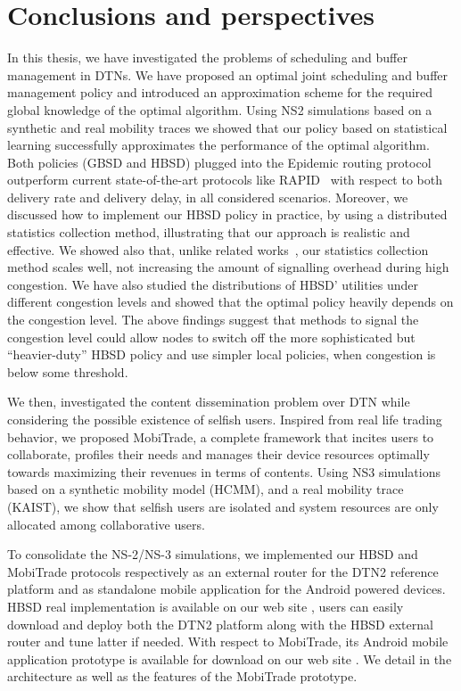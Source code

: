 \chapter{Conclusions and perspectives}
\label{chapter:conclusions}

In this thesis, we have investigated the problems of scheduling and buffer management in DTNs. We have proposed an optimal joint scheduling and buffer management policy and introduced an approximation scheme for the required global knowledge of the optimal algorithm. Using NS2 simulations based on a synthetic and real mobility traces we showed that our policy based on statistical learning successfully approximates the performance of the optimal algorithm. Both
policies (GBSD and HBSD) plugged into the Epidemic routing protocol
outperform current state-of-the-art protocols like RAPID~\cite{Levine:Sigcomm07} with respect to both delivery rate and delivery delay, in all considered scenarios. Moreover, we discussed how to implement our HBSD policy in practice, by using a distributed statistics collection method, illustrating that our approach is realistic and effective. We showed also that, unlike related works~\cite{Levine:Sigcomm07, AOBM}, our statistics collection method scales well, not increasing the amount of signalling overhead during high congestion. We have also studied the distributions of HBSD' utilities under different congestion levels and showed that the optimal policy heavily depends on the congestion level. The above findings suggest that methods to signal the congestion level could allow nodes to switch off the more sophisticated but ``heavier-duty'' HBSD policy and use simpler local policies, when congestion is below some threshold. 

We then, investigated the content dissemination problem over DTN while considering the possible existence of selfish users.
Inspired from real life trading behavior, we proposed MobiTrade, a complete framework that incites users to collaborate, profiles their needs and manages their device resources optimally towards maximizing their revenues in terms of contents. Using NS3 simulations based on a synthetic mobility model (HCMM), and a real mobility trace (KAIST), we show that selfish users are isolated and system resources are only allocated among collaborative users. 

To consolidate the NS-2/NS-3 simulations, we implemented our HBSD and MobiTrade protocols respectively as an external router for the DTN2 reference platform and as standalone mobile application for the Android powered devices. HBSD real implementation is available on our web site \cite{HBSDDTN2}, users can easily download and deploy both the DTN2 platform along with the HBSD external router and tune latter if needed. With respect to MobiTrade, its Android mobile application prototype is available for download on our web site \cite{MobiTradeAndroid}. We detail in \cite{MobiTradeAndroid} the architecture as well as the features of the MobiTrade prototype. 

